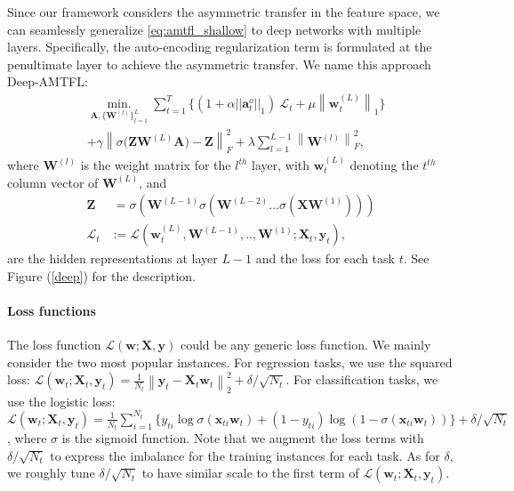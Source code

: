 \documentclass{article}
\newcommand{\vct}[1]{\boldsymbol{#1}} %
\newcommand{\mat}[1]{\boldsymbol{#1}} %
\newcommand{\norm}[1]{\left\|#1\right\|}
\begin{document}
	Since our framework considers the asymmetric transfer in the feature space, we can seamlessly generalize \eqref{eq:amtfl_shallow} to deep networks with multiple layers. Specifically, the auto-encoding regularization term is formulated at the penultimate layer to achieve the asymmetric transfer. We name this approach Deep-AMTFL:
	\begin{equation}
	\begin{aligned}
	&\operatorname*{min.}_{\mat{A},\{\mat{W}^{(l)}\}_{l=1}^L} \sum_{t=1}^T \Big\{(1+\alpha ||\vct{a}_t^o||_1)\ \mathcal{L}_t + \mu\norm{\vct{w}_t^{(L)}}_1\Big\}\\ 
	&+ \gamma \norm{\sigma \big(\mat{Z}\mat{W}^{(L)}\mat{A}\big)-\mat{Z}}_{F}^2 + \lambda \sum_{l=1}^{L-1} \norm{\mat{W}^{(l)}}_F^2,\label{eq:amtfl_deep}
	\end{aligned}
	\end{equation}
	where $\mat{W}^{(l)}$ is the weight matrix for the $l^{th}$ layer, with $\vct{w}_t^{(L)}$ denoting the $t^{th}$ column vector of $\mat{W}^{(L)}$, and
	\begin{equation*}
	\begin{aligned}
	\mat{Z} &\ = \sigma(\mat{W}^{(L-1)} \sigma(\mat{W}^{(L-2)} \dots \sigma(\vct{X}\mat{W}^{(1)}))) \\
	\mathcal{L}_t &:= \mathcal{L}(\vct{w}_t^{(L)}, \mat{W}^{(L-1)},..,\mat{W}^{(1)}; \mat{X}_t,\vct{y}_t),
	\end{aligned}
	\end{equation*}
	are the hidden representations at layer $L-1$ and the loss for each task $t$. See Figure (\ref{deep}) for the description. 
	
	\paragraph{Loss functions}
	The loss function $\mathcal{L}(\vct{w}; \mat{X}, \vct{y})$ could be any generic loss function. We mainly consider the two most popular instances. For regression tasks, we use the squared loss: $\mathcal{L}(\vct{w}_t;\mat{X}_t,\vct{y}_t) = \frac{1}{N_t} \norm{\vct{y}_t-\mat{X}_t\vct{w}_t}_2^2 + \delta/\sqrt{N_t}$.
	For classification tasks, we use the logistic loss: $\mathcal{L}(\vct{w}_t;\mat{X}_t,\vct{y}_t) = \frac{1}{N_t} \sum_{i=1}^{N_t} \{y_{ti} \log{\sigma(\vct{x}_{ti}\vct{w}_t)} + (1-y_{ti})\log{(1-\sigma(\vct{x}_{ti}\vct{w}_t))} \} + \delta/\sqrt{N_t}$, where $\sigma$ is the sigmoid function. Note that we augment the loss terms with $\delta/\sqrt{N_t}$ to express the imbalance for the training instances for each task. %
	As for $\delta$, we roughly tune $\delta/\sqrt{N_t}$ to have similar scale to the first term of $\mathcal{L}(\vct{w}_t;\mat{X}_t, \vct{y}_t)$.
	
\end{document}
